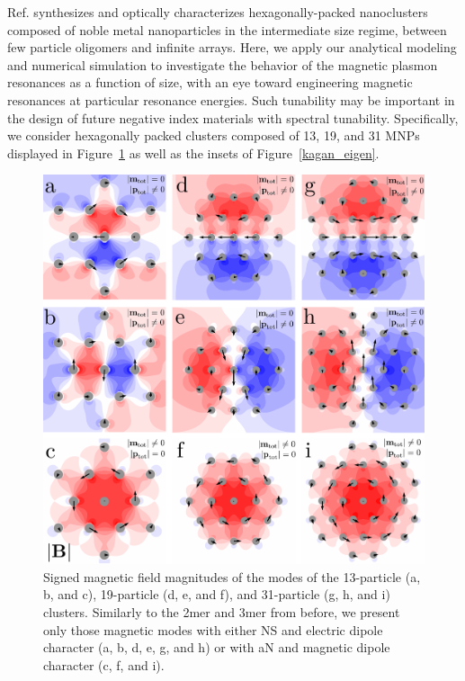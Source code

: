\documentclass[journal=apchd5,manuscript=article]{achemso}
\begin{document}
Ref. \cite{Engheta2017} synthesizes and optically characterizes hexagonally-packed nanoclusters composed of noble metal nanoparticles in the intermediate size regime, between few particle oligomers and infinite arrays. Here, we apply our analytical modeling and numerical simulation to investigate the behavior of the magnetic plasmon resonances as a function of size, with an eye toward engineering magnetic resonances at particular resonance energies. Such tunability may be important in the design of future negative index materials with spectral tunability. Specifically, we consider hexagonally packed clusters composed of 13, 19, and 31 MNPs displayed in Figure~\ref{kagan_fields} as well as the insets of Figure~\ref{kagan_eigen}.

\begin{figure}
\includegraphics{kagan_fields.pdf}
\caption{Signed magnetic field magnitudes of the modes of the 13-particle (a, b, and c), 19-particle (d, e, and f), and 31-particle (g, h, and i) clusters. Similarly to the 2mer and 3mer from before, we present only those magnetic modes with either NS and electric dipole character (a, b, d, e, g, and h) or with aN and magnetic dipole character (c, f, and i).}
\label{kagan_fields}
\end{figure}
\end{document}
